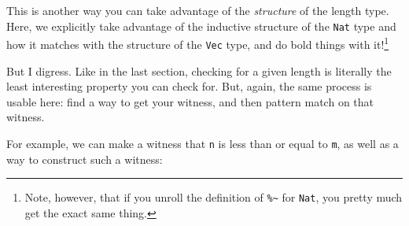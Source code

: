 \documentclass[]{article}
\newenvironment{Shaded}{}{}
\newcommand{\CommentTok}[1]{\textcolor[rgb]{0.38,0.63,0.69}{\textit{#1}}}
\newcommand{\DataTypeTok}[1]{\textcolor[rgb]{0.56,0.13,0.00}{#1}}
\newcommand{\KeywordTok}[1]{\textcolor[rgb]{0.00,0.44,0.13}{\textbf{#1}}}
\newcommand{\NormalTok}[1]{#1}
\newcommand{\OperatorTok}[1]{\textcolor[rgb]{0.40,0.40,0.40}{#1}}
\newcommand{\OtherTok}[1]{\textcolor[rgb]{0.00,0.44,0.13}{#1}}
\begin{document}
\begin{Shaded}
\end{Shaded}

This is another way you can take advantage of the \emph{structure} of the length
type. Here, we explicitly take advantage of the inductive structure of the
\texttt{Nat} type and how it matches with the structure of the \texttt{Vec}
type, and do bold things with it!\footnote{Note, however, that if you unroll the
  definition of \texttt{\%\textasciitilde{}} for \texttt{Nat}, you pretty much
  get the exact same thing.}

But I digress. Like in the last section, checking for a given length is
literally the least interesting property you can check for. But, again, the same
process is usable here: find a way to get your witness, and then pattern match
on that witness.

For example, we can make a witness that \texttt{n} is less than or equal to
\texttt{m}, as well as a way to construct such a witness:
\end{document}

